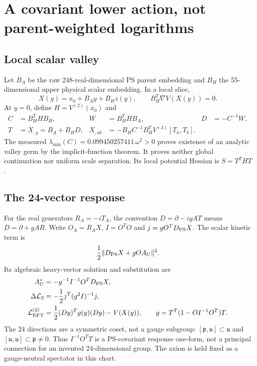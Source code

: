 \documentclass[11pt]{article}
\begin{document}
\section{A covariant lower action, not parent-weighted logarithms}
\subsection{Local scalar valley}
Let $B_A$ be the raw 248-real-dimensional PS parent embedding and $B_H$
the 55-dimensional upper physical scalar embedding. In a local slice,
\begin{equation}
 X(y)=x_0+B_Ay+B_Hz(y),\qquad B_H^T\nabla V(X(y))=0.
\end{equation}
At $y=0$, define $H=V^{(2)}(x_0)$ and
\begin{align}
 C&=B_H^THB_H,& W&=B_H^THB_A,& D&=-C^{-1}W,\\
 T&=X_{,y}=B_A+B_HD,&
 X_{,ab}&=-B_HC^{-1}B_H^TV^{(3)}[T_a,T_b].
\end{align}
The measured $\lambda_{\min}(C)=0.099450257411\,\omega^2>0$ proves
existence of an analytic valley germ by the implicit-function theorem.
It proves neither global continuation nor uniform scale separation.
Its local potential Hessian is $S=T^THT$.

\subsection{The 24-vector response}
For the real generators $R_A=-iT_A$, the convention $D=\partial-igAT$
means $D=\partial+gAR$. Write $O_A=R_AX$, $I=O^TO$ and
$j=gO^TD_{\rm PS}X$. The scalar kinetic term is
\begin{equation}
 \frac12\lVert D_{\rm PS}X+gOA_U\rVert^2.
\end{equation}
Its algebraic heavy-vector solution and substitution are
\begin{align}
 A_U^*&=-g^{-1}I^{-1}O^TD_{\rm PS}X,\\
 \Delta\mathcal L_2&=-\frac12j^T(g^2I)^{-1}j,\\
 \mathcal L_{\rm EFT}^{(2)}&=\frac12(Dy)^Tg(y)(Dy)-V(X(y)),\qquad
 g=T^T(1-OI^{-1}O^T)T. \label{eq:metric}
\end{align}
The 24 directions are a symmetric coset, not a gauge subgroup:
$[\mathfrak p,\mathfrak u]\subset\mathfrak u$ and
$[\mathfrak u,\mathfrak u]\subset\mathfrak p\ne0$. Thus
$I^{-1}O^TT$ is a PS-covariant response one-form, not a principal
connection for an invented 24-dimensional group. The axion is held fixed
as a gauge-neutral spectator in this chart.
\end{document}
